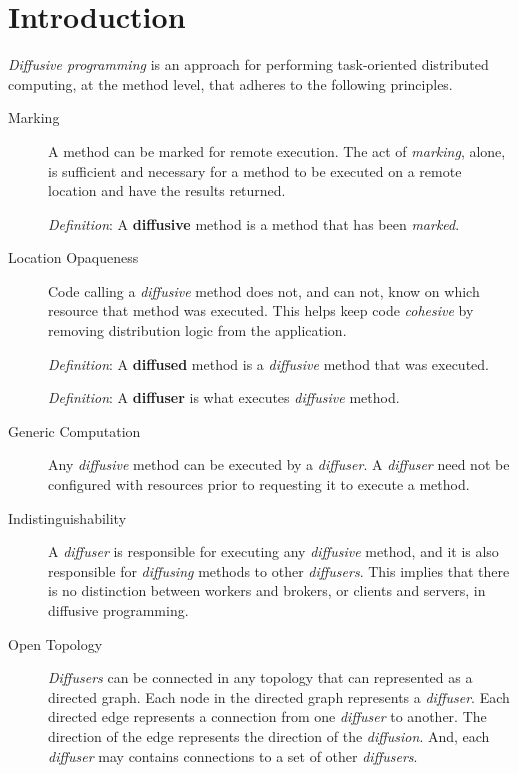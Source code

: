 \documentclass[11pt]{amsart}
\begin{document}
\section{Introduction}
\emph{Diffusive programming} is an approach for performing task-oriented distributed computing, at the method level, that adheres to the following principles.
\begin{description}

	\item[Marking] 
	A method can be marked for remote execution. The act of \emph{marking}, alone, is sufficient and necessary for a method to be executed on a remote location and have the results returned. 
	
	\emph{Definition}: A \textbf{diffusive} method is a method that has been \emph{marked}.

	\item[Location Opaqueness]
	Code calling a \emph{diffusive} method does not, and can not, know on which resource that method was executed. This helps keep code \emph{cohesive} by removing distribution logic from the application. 
	
	\emph{Definition}: A \textbf{diffused} method is a \emph{diffusive} method that was executed. 
	
	\emph{Definition}: A \textbf{diffuser} is what executes \emph{diffusive} method.
	
	\item[Generic Computation]
	Any \emph{diffusive} method can be executed by a \emph{diffuser}. A \emph{diffuser} need not be configured with resources prior to requesting it to execute a method.
	
	\item[Indistinguishability]
	A \emph{diffuser} is responsible for executing any \emph{diffusive} method, and it is also responsible for \emph{diffusing} methods to other \emph{diffusers}. This implies that there is no distinction between workers and brokers, or clients and servers, in diffusive programming.
	
	\item[Open Topology]
	\emph{Diffusers} can be connected in any topology that can represented as a directed graph. Each node in the directed graph represents a \emph{diffuser}. Each directed edge represents a connection from one \emph{diffuser} to another. The direction of the edge represents the direction of the \emph{diffusion}. And, each \emph{diffuser} may contains connections to a set of other \emph{diffusers}. 
	

\end{description}
\end{document}
